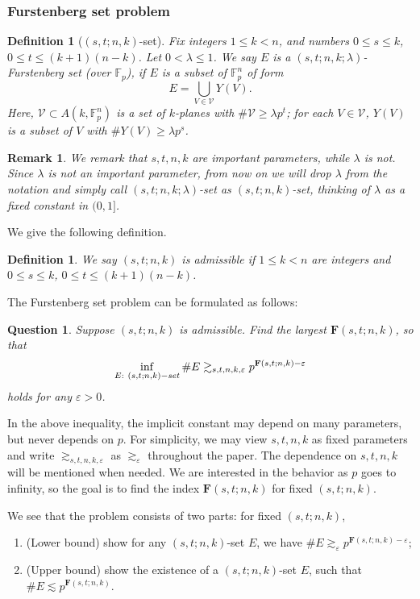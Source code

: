 \documentclass[10pt]{article}
\newtheorem{remark}[theorem]{Remark}
\newtheorem{definition}[theorem]{Definition}
\newtheorem{question}{Question}
\newcommand{\cV}{\mathcal{V}}
\newcommand{\bF}{\mathbf{F}}
\newcommand{\e}{\varepsilon}
\newcommand{\Fp}{\mathbb{F}_p}
\newcommand{\lam}{\lambda}
\begin{document}
\subsubsection{Furstenberg set problem}

\begin{definition}[$(s,t;n,k)$-set]
    Fix integers $1\le k<n$, and numbers $0\le s\le k$, $0\le t\le (k+1)(n-k)$. Let $0<\lam\le 1$. We say $E$ is a $(s,t;n,k;\lam)$-Furstenberg set (over $\Fp$), if $E$ is a subset of $\Fp^n$ of form
    \[ E=\bigcup_{V\in\cV}Y(V). \]
    Here, $\cV\subset A(k,\Fp^n)$ is a set of $k$-planes with $\#\cV\ge \lam p^t$; for each $V\in\cV$, $Y(V)$ is a subset of $V$ with $\#Y(V)\ge \lam p^s$. 
\end{definition}

\begin{remark}
   {\rm We remark that $s,t,n,k$ are important parameters, while $\lam$ is not.
   Since $\lambda$ is not an important parameter, from now on we will drop $\lam$ from the notation and simply call $(s,t;n,k;\lam)$-set as $(s,t;n,k)$-set, thinking of $\lam$ as a fixed constant in $(0,1]$. 
   }
\end{remark}

We give the following definition.
\begin{definition}
    We say $(s,t;n,k)$ is admissible if $1\le k<n$ are integers and $0\le s\le k$, $0\le t\le (k+1)(n-k)$.
\end{definition}

The Furstenberg set problem can be formulated as follows:

\begin{question}
Suppose $(s,t;n,k)$ is admissible.
Find the largest $\bF(s,t;n,k)$, so that 
\begin{equation}\label{deff}
    \inf_{E:\ (s,t;n,k)\textup{-set}} \#E\gtrsim_{s,t,n,k,\e} p^{\bF(s,t;n,k)-\e} 
\end{equation}
holds for any $\e>0$.
\end{question}

In the above inequality, the implicit constant may depend on many parameters, but never depends on $p$. For simplicity, we may view $s,t,n,k$ as fixed parameters and write $\gtrsim_{s,t,n,k,\e}$ as $\gtrsim_\e$ throughout the paper. The dependence on $s,t,n,k$ will be mentioned when needed. 
We are interested in the behavior as $p$ goes to infinity, so the goal is to find the index $\bF(s,t;n,k)$ for fixed $(s,t;n,k)$.

We see that the problem consists of two parts:
for fixed $(s,t;n,k)$,
\begin{enumerate}
    \item (Lower bound) show for any $(s,t;n,k)$-set $E$, we have $\#E\gtrsim_{\e} p^{\bF(s,t;n,k)-\e}$;
    \item (Upper bound) show the existence of a $(s,t;n,k)$-set $E$, such that $\#E\lesssim p^{\bF(s,t;n,k)}$.
\end{enumerate}
\end{document}
